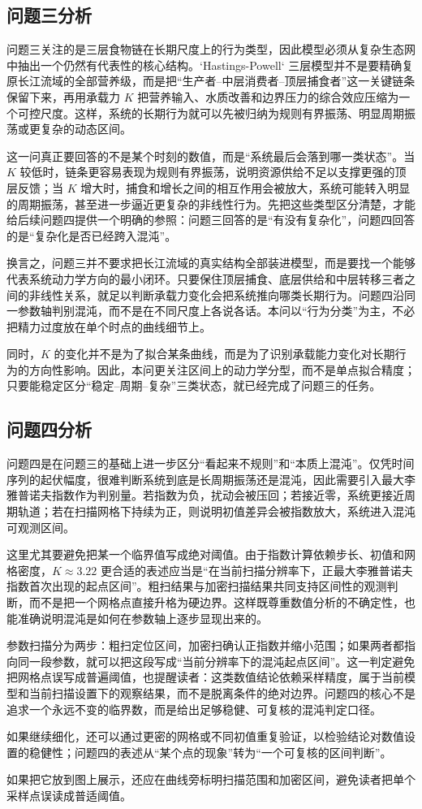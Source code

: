 \subsection{问题三分析}
问题三关注的是三层食物链在长期尺度上的行为类型，因此模型必须从复杂生态网中抽出一个仍然有代表性的核心结构。`Hastings-Powell` 三层模型并不是要精确复原长江流域的全部营养级，而是把“生产者--中层消费者--顶层捕食者”这一关键链条保留下来，再用承载力 \(K\) 把营养输入、水质改善和边界压力的综合效应压缩为一个可控尺度。这样，系统的长期行为就可以先被归纳为规则有界振荡、明显周期振荡或更复杂的动态区间。

这一问真正要回答的不是某个时刻的数值，而是“系统最后会落到哪一类状态”。当 \(K\) 较低时，链条更容易表现为规则有界振荡，说明资源供给不足以支撑更强的顶层反馈；当 \(K\) 增大时，捕食和增长之间的相互作用会被放大，系统可能转入明显的周期振荡，甚至进一步逼近更复杂的非线性行为。先把这些类型区分清楚，才能给后续问题四提供一个明确的参照：问题三回答的是“有没有复杂化”，问题四回答的是“复杂化是否已经跨入混沌”。

换言之，问题三并不要求把长江流域的真实结构全部装进模型，而是要找一个能够代表系统动力学方向的最小闭环。只要保住顶层捕食、底层供给和中层转移三者之间的非线性关系，就足以判断承载力变化会把系统推向哪类长期行为。问题四沿同一参数轴判别混沌，而不是在不同尺度上各说各话。本问以“行为分类”为主，不必把精力过度放在单个时点的曲线细节上。

同时，\(K\) 的变化并不是为了拟合某条曲线，而是为了识别承载能力变化对长期行为的方向性影响。因此，本问更关注区间上的动力学分型，而不是单点拟合精度；只要能稳定区分“稳定--周期--复杂”三类状态，就已经完成了问题三的任务。

\subsection{问题四分析}
问题四是在问题三的基础上进一步区分“看起来不规则”和“本质上混沌”。仅凭时间序列的起伏幅度，很难判断系统到底是长周期振荡还是混沌，因此需要引入最大李雅普诺夫指数作为判别量。若指数为负，扰动会被压回；若接近零，系统更接近周期轨道；若在扫描网格下持续为正，则说明初值差异会被指数放大，系统进入混沌可观测区间。

这里尤其要避免把某一个临界值写成绝对阈值。由于指数计算依赖步长、初值和网格密度，\(K\approx 3.22\) 更合适的表述应当是“在当前扫描分辨率下，正最大李雅普诺夫指数首次出现的起点区间”。粗扫结果与加密扫描结果共同支持区间性的观测判断，而不是把一个网格点直接升格为硬边界。这样既尊重数值分析的不确定性，也能准确说明混沌是如何在参数轴上逐步显现出来的。

参数扫描分为两步：粗扫定位区间，加密扫确认正指数并缩小范围；如果两者都指向同一段参数，就可以把这段写成“当前分辨率下的混沌起点区间”。这一判定避免把网格点误写成普遍阈值，也提醒读者：这类数值结论依赖采样精度，属于当前模型和当前扫描设置下的观察结果，而不是脱离条件的绝对边界。问题四的核心不是追求一个永远不变的临界数，而是给出足够稳健、可复核的混沌判定口径。

如果继续细化，还可以通过更密的网格或不同初值重复验证，以检验结论对数值设置的稳健性；问题四的表述从“某个点的现象”转为“一个可复核的区间判断”。

如果把它放到图上展示，还应在曲线旁标明扫描范围和加密区间，避免读者把单个采样点误读成普适阈值。
